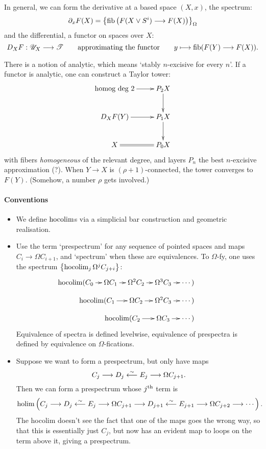 \documentclass[11pt]{article}
\begin{document}
\begin{Calculus I}
\begin{itemise}
\item In general, we can form the derivative at a based space $(X,x)$, the spectrum:
\[\partial_xF(X)= \left\{\operatorname{fib}\left(F(X\vee S^i)\longrightarrow F(X)\right)\right\}_\Omega\]
and the differential, a functor on spaces over $X$:
\[D_XF:\mathscr{U}_X\longrightarrow\mathscr{T}\textup{\qquad approximating the functor\qquad }y\longmapsto\operatorname{fib}(F(Y)\longrightarrow F(X)).\]
\item There is a notion of analytic, which means `stably $n$-excisive for every $n$'. If a functor is analytic, one can construct a Taylor tower:
\[\xymatrix{
\textup{homog deg 2}\ar[r]&\ar[d]P_2X\\
D_XF(Y)\ar[r]&\ar[d]P_1X\\
X\ar@{=}[r]
&P_0X
}
\]
with fibers \emph{homogeneous} of the relevant degree, and layers $P_n$ the best $n$-excisive approximation (?). When $Y\to X$ is $(\rho+1)$-connected, the tower converges to $F(Y)$. (Somehow, a number $\rho$ gets involved.)
\end{itemise}
\paragraph*{Conventions}
\begin{itemize}\squishlist
\setlength{\parindent}{.25in}
\item We define $\operatorname*{hocolim}$s via a simplicial bar construction and geometric realisation.
\item Use the term `prespectrum' for any sequence of  pointed spaces and maps $C_i\to\Omega C_{i+1}$, and `spectrum' when these are equivalences. To $\Omega$-fy, one uses the spectrum $\left\{ \operatorname*{hocolim}_j\Omega^jC_{j+i}\right\}$:
\[\xymatrix@=3mm{
\makebox[0cm][r]{$\hocolim($}C_0
\ar[r]
&
\Omega C_1
\ar[r]
&%
\Omega^2 C_2
\ar[r]
&%
\Omega^3C_3
\ar[r]
&%
\makebox[0cm][l]{$\cdots )$}&%
\\
&
\makebox[0cm][r]{$\hocolim($}C_1
\ar[r]
&
\Omega C_2
\ar[r]
&%
\Omega^2 C_3
\ar[r]
&%
\makebox[0cm][l]{$\cdots )$}&%
\\
&&
\makebox[0cm][r]{$\hocolim($}C_2
\ar[r]
&
\Omega C_3
\ar[r]
&%
\makebox[0cm][l]{$\cdots )$}&%
}\]
Equivalence of spectra is defined levelwise, equivalence of prespectra is defined by equivalence on $\Omega$-fications.
\item Suppose we want to form a prespectrum, but only have maps
\[C_j\longrightarrow D_j\overset{\sim}{\longleftarrow}E_j\longrightarrow\Omega C_{j+1}.\]
Then we can form a prespectrum whose $j^\textup{th}$ term is
\[\operatorname*{holim}\left(C_j\longrightarrow D_j\overset{\sim}{\longleftarrow}E_j\longrightarrow\Omega C_{j+1}\longrightarrow D_{j+1}\overset{\sim}{\longleftarrow}E_{j+1}\longrightarrow\Omega C_{j+2}\longrightarrow\cdots \right).\]
The hocolim doesn't see the fact that one of the maps goes the wrong way, so that this is essentially just $C_j$, but now has an evident map to loops on the term above it, giving a prespectrum.
\end{itemize}

\end{Calculus I}
\end{document}
